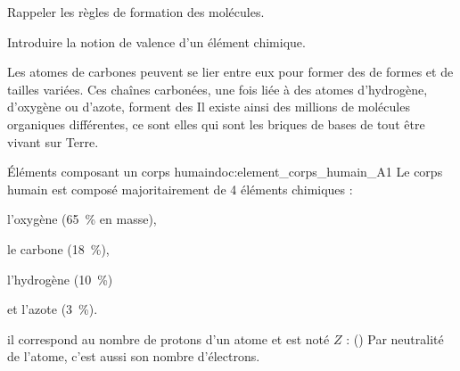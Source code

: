 \tetePremStssStru

\vspace*{-30pt}


\begin{objectifs}
  \item Rappeler les règles de formation des molécules.
  \item Introduire la notion de valence d'un élément chimique.
\end{objectifs}

\begin{contexte}
  Les atomes de carbones peuvent se lier entre eux pour former des  de formes et de tailles variées.
  Ces chaînes carbonées, une fois liée à des atomes d'hydrogène, d'oxygène ou d'azote, forment des 
  Il existe ainsi des millions de molécules organiques différentes, ce sont elles qui sont les briques de bases de tout être vivant sur Terre.

\end{contexte}


\begin{doc}{Éléments composant un corps humain}{doc:element_corps_humain_A1}
  Le corps humain est composé majoritairement de 4 éléments chimiques :
  \vspace*{-4pt}
  \begin{multicols}{2}
  \begin{listePoints}
    \item l'oxygène    (\qty{65}{\percent} en masse),
    \item le carbone   (\qty{18}{\percent}),
    \item l'hydrogène  (\qty{10}{\percent})
    \item et l'azote   (\qty{3}{\percent}).
  \end{listePoints}
  \end{multicols}
  
  \begin{importants}
     il correspond au nombre de protons d'un atome et est noté $Z$ :  (\hspace{-8pt}\exemple {})
    Par neutralité de l'atome, c'est aussi son nombre d'électrons.
  \end{importants}
\end{doc}


